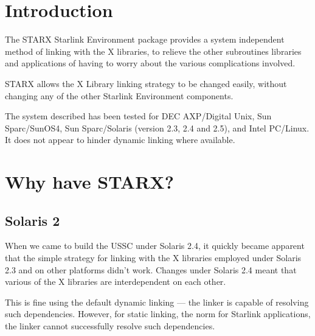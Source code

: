 
\section{Introduction}

The STARX Starlink Environment package provides a system independent
method of linking with the X libraries, to relieve the other
subroutines libraries and applications of having to worry about the
various complications involved.

STARX allows the X Library linking strategy to be changed easily, without 
changing any of the other Starlink Environment components.

The system described has been tested for DEC AXP/Digital Unix, Sun
Sparc/SunOS4, Sun Sparc/Solaris (version 2.3, 2.4 and 2.5), and Intel
PC/Linux.  It does not appear to hinder dynamic linking where
available.

\section{Why have STARX?}

\subsection{Solaris 2}

When we came to build the USSC under Solaris 2.4, it quickly became
apparent that the simple strategy for linking with the X libraries
employed under Solaris 2.3 and on other platforms didn't work.  Changes
under Solaris 2.4 meant that various of the X libraries are
interdependent on each other.  

This is fine using the default dynamic linking --- the linker is
capable of resolving such dependencies.  However, for static linking,
the norm for Starlink applications, the linker cannot successfully
resolve such dependencies. 

